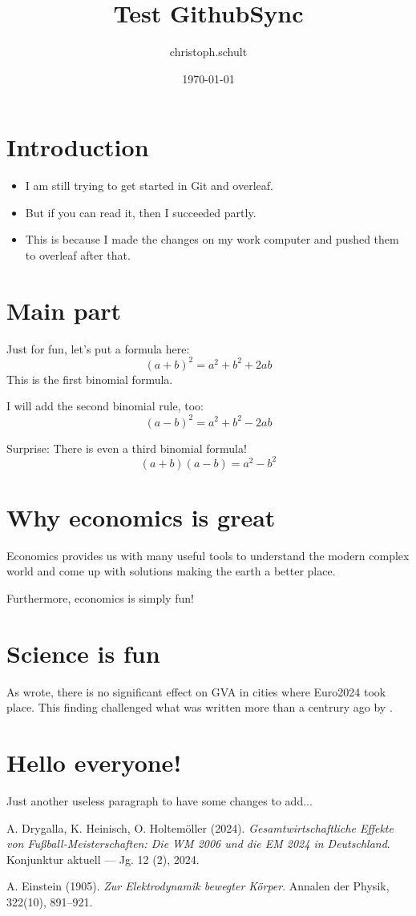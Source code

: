 \documentclass{article}
\title{Test GithubSync}
\author{christoph.schult }
\date{\today}
\begin{document}
\maketitle

\section{Introduction}

\begin{itemize} 
    \item I am still trying to get started in Git and overleaf.
    \item But if you can read it, then I succeeded partly.
    \item This is because I made the changes on my work computer and pushed them to overleaf after that.
\end{itemize}

\section{Main part}
Just for fun, let's put a formula here: 
$$ (a + b)^2 = a^2 + b^2 + 2ab $$
This is the first binomial formula. 

I will add the second binomial rule, too:
$$ (a - b)^2 = a^2 + b^2 - 2ab $$

Surprise: There is even a third binomial formula!
$$ (a + b)(a - b) = a^2 - b^2 $$

\section{Why economics is great}
Economics provides us with many useful tools to understand the modern 
complex world and come up with solutions making the earth a better place.

Furthermore, economics is simply fun!

\section{Science is fun}
As \cite{holtem2024a} wrote, there is no significant effect on GVA in cities where Euro2024 took place. This finding challenged what was written more than a centrury ago by \cite{einstein1905}.

\section{Hello everyone!}
Just another useless paragraph to have some changes to add...

\begin{thebibliography}{9}

  A. Drygalla, K. Heinisch, O. Holtemöller (2024). 
  \textit{Gesamtwirtschaftliche Effekte von Fußball-Meisterschaften: Die WM 2006 und die EM 2024 in Deutschland}. 
  Konjunktur aktuell — Jg. 12 (2), 2024.


 A. Einstein (1905). 
 \textit{Zur Elektrodynamik bewegter Körper}. 
 Annalen der Physik, 322(10), 891--921.

\end{thebibliography}
\end{document}
